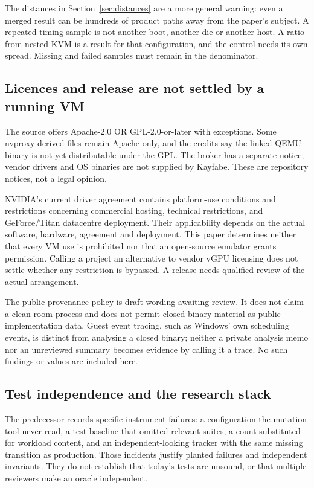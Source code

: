 The distances in Section~\ref{sec:distances} are a more general warning: even a merged result
can be hundreds of product paths away from the paper's subject. A repeated timing sample is
not another boot, another die or another host. A ratio from nested KVM is a result for that
configuration, and the control needs its own spread. Missing and failed samples must remain
in the denominator.

\subsection{Licences and release are not settled by a running VM}

\doc The source offers Apache-2.0 OR GPL-2.0-or-later with exceptions. Some nvproxy-derived
files remain Apache-only, and the credits say the linked QEMU binary is not yet distributable
under the GPL. The broker has a separate notice; vendor drivers and OS binaries are not
supplied by Kayfabe. These are repository notices, not a legal opinion.

\doc NVIDIA's current driver agreement contains platform-use conditions and restrictions
concerning commercial hosting, technical restrictions, and GeForce/Titan datacentre deployment.
Their applicability depends on the actual software, hardware, agreement and deployment.
This paper determines neither that every VM use is prohibited nor that an open-source
emulator grants permission. Calling a project an alternative to vendor vGPU licensing does
not settle whether any restriction is bypassed. A release needs qualified review of the
actual arrangement.

\doc The public provenance policy is draft wording awaiting review. It does not claim a
clean-room process and does not permit closed-binary material as public implementation data.
Guest event tracing, such as Windows' own scheduling events, is distinct from analysing a
closed binary; neither a private analysis memo nor an unreviewed summary becomes evidence by
calling it a trace. No such findings or values are included here.

\subsection{Test independence and the research stack}

\doc The predecessor records specific instrument failures: a configuration the mutation tool
never read, a test baseline that omitted relevant suites, a count substituted for workload
content, and an independent-looking tracker with the same missing transition as production.
Those incidents justify planted failures and independent invariants. They do not establish
that today's tests are unsound, or that multiple reviewers make an oracle independent.

